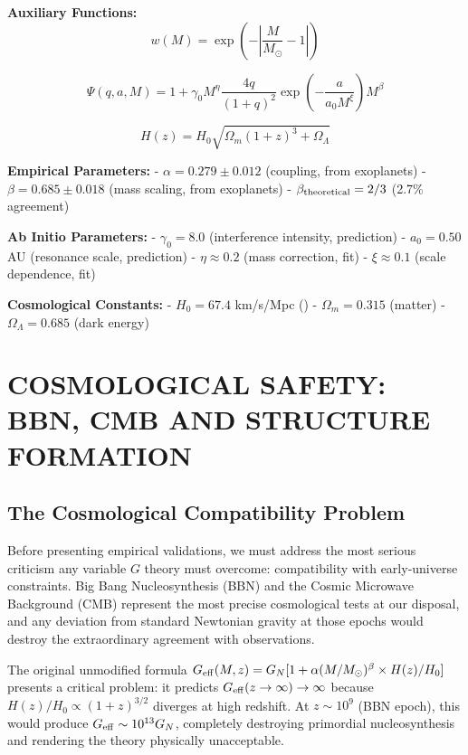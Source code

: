 \documentclass[10pt,a4paper]{article}
\begin{document}
\textbf{Auxiliary Functions:}
\[w(M) = \exp\left(-\left|\frac{M}{M_\odot}-1\right|\right)\]

\[\Psi(q,a,M) = 1 + \gamma_0 M^\eta \frac{4q}{(1+q)^2} \exp\left(-\frac{a}{a_0 M^\xi}\right) M^\beta\]

\[H(z) = H_0 \sqrt{\Omega_m(1+z)^3 + \Omega_\Lambda}\]

\textbf{Empirical Parameters:} - \(\alpha = 0.279 \pm 0.012\) (coupling,
from exoplanets) - \(\beta = 0.685 \pm 0.018\) (mass scaling, from
exoplanets) - \(\beta_{\rm theoretical} = 2/3\) (2.7\% agreement)

\textbf{Ab Initio Parameters:} - \(\gamma_0 = 8.0\) (interference
intensity, prediction) - \(a_0 = 0.50\) AU (resonance scale, prediction)
- \(\eta \approx 0.2\) (mass correction, fit) - \(\xi \approx 0.1\)
(scale dependence, fit)

\textbf{Cosmological Constants:} - \(H_0 = 67.4\) km/s/Mpc (\cite{PlanckCollaboration2020a})
- \(\Omega_m = 0.315\) (matter) - \(\Omega_\Lambda = 0.685\) (dark
energy)

\section{COSMOLOGICAL SAFETY: BBN, CMB AND STRUCTURE
FORMATION}\label{cosmological-safety-bbn-cmb-and-structure-formation}

\subsection{The Cosmological Compatibility
Problem}\label{the-cosmological-compatibility-problem}

Before presenting empirical validations, we must address the most
serious criticism any variable \(G\) theory must overcome: compatibility
with early-universe constraints. Big Bang Nucleosynthesis (BBN) and the
Cosmic Microwave Background (CMB) represent the most precise
cosmological tests at our disposal, and any deviation from standard
Newtonian gravity at those epochs would destroy the extraordinary
agreement with observations.

The original unmodified formula
\(G_{\rm eff}(M,z) = G_N[1 + \alpha(M/M_\odot)^\beta \times H(z)/H_0]\)
presents a critical problem: it predicts
\(G_{\rm eff}(z \to \infty) \to \infty\) because
\(H(z)/H_0 \propto (1+z)^{3/2}\) diverges at high redshift. At
\(z \sim 10^9\) (BBN epoch), this would produce
\(G_{\rm eff} \sim 10^{13} G_N\), completely destroying primordial
nucleosynthesis and rendering the theory physically unacceptable.
\end{document}
